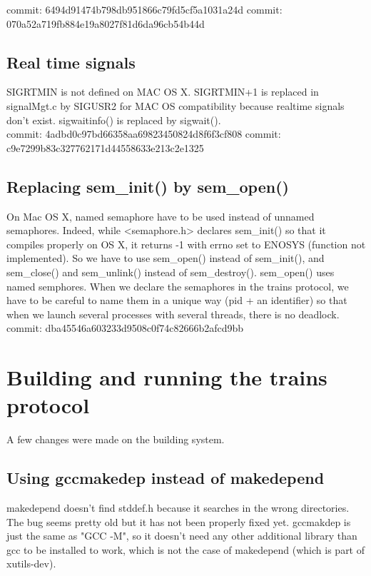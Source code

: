 \documentclass[a4paper,10pt]{report}
\begin{document}
    commit: 6494d91474b798db951866c79fd5cf5a1031a24d
    commit: 070a52a719fb884e19a8027f81d6da96cb54b44d 
    

\subsection{Real time signals}
    SIGRTMIN is not defined on MAC OS X.
    SIGRTMIN+1 is replaced in signalMgt.c by SIGUSR2 for MAC OS
    compatibility because realtime signals don't exist.
    sigwaitinfo() is replaced by sigwait().\\

    commit: 4adbd0c97bd66358aa69823450824d8f6f3cf808
    commit: c9e7299b83c327762171d44558633e213c2e1325

\subsection{Replacing sem\_init() by sem\_open()}
    
    On Mac OS X, named semaphore have to be used instead of unnamed
    semaphores. Indeed, while <semaphore.h> declares sem\_init() so that it
    compiles properly on OS X, it returns -1 with errno set to ENOSYS
    (function not implemented).
    So we have to use sem\_open() instead of sem\_init(), and sem\_close() and
    sem\_unlink() instead of sem\_destroy().
    sem\_open() uses named semphores. When we declare the semaphores in the trains protocol, 
    we have to be careful to name them in a unique way (pid + an identifier) so that when we launch
    several processes with several threads, there is no deadlock.\\
 
    commit: dba45546a603233d9508c0f74c82666b2afcd9bb

\section{Building and running the trains protocol}

A few changes were made on the building system.

\subsection{Using gccmakedep instead of makedepend} 

makedepend doesn't find stddef.h because it searches in the wrong directories.
    The bug seems pretty old but it has not been properly fixed yet.
    gccmakdep is just the same as "GCC -M", so it doesn't need any
    other additional library than gcc to be installed to work, which is not
    the case of makedepend (which is part of xutils-dev).
\end{document}

